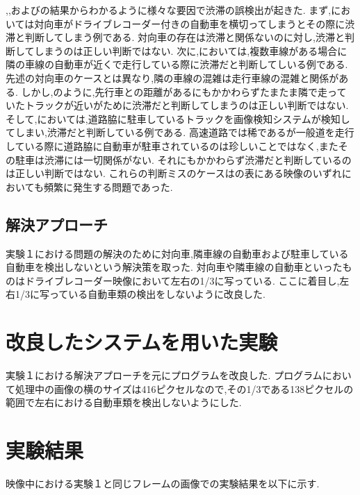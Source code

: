 ,,およびの結果からわかるように様々な要因で渋滞の誤検出が起きた.
まず,においては対向車がドライブレコーダー付きの自動車を横切ってしまうとその際に渋滞と判断してしまう例である.
対向車の存在は渋滞と関係ないのに対し,渋滞と判断してしまうのは正しい判断ではない.
次に,においては,複数車線がある場合に隣の車線の自動車が近くで走行している際に渋滞だと判断してしいる例である.
先述の対向車のケースとは異なり,隣の車線の混雑は走行車線の混雑と関係がある.
しかし,のように,先行車との距離があるにもかかわらずたまたま隣で走っていたトラックが近いがために渋滞だと判断してしまうのは正しい判断ではない.
そして,においては,道路脇に駐車しているトラックを画像検知システムが検知してしまい,渋滞だと判断している例である.
高速道路では稀であるが一般道を走行している際に道路脇に自動車が駐車されているのは珍しいことではなく,またその駐車は渋滞には一切関係がない.
それにもかかわらず渋滞だと判断しているのは正しい判断ではない.
これらの判断ミスのケースはの表にある映像のいずれにおいても頻繁に発生する問題であった.

\subsection{解決アプローチ}
実験１における問題の解決のために対向車,隣車線の自動車および駐車している自動車を検出しないという解決策を取った.
対向車や隣車線の自動車といったものはドライブレコーダー映像において左右の1/3に写っている.
ここに着目し,左右1/3に写っている自動車類の検出をしないように改良した.

\newpage

\section{改良したシステムを用いた実験}
実験１における解決アプローチを元にプログラムを改良した.
プログラムにおいて処理中の画像の横のサイズは416ピクセルなので,その1/3である138ピクセルの範囲で左右における自動車類を検出しないようにした.

\section{実験結果}
映像中における実験１と同じフレームの画像での実験結果を以下に示す.

